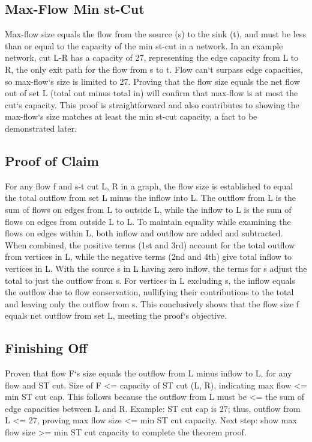 \subsection*{Max-Flow  Min st-Cut}
Max-flow size equals the flow from the source (s) to the sink (t), and must be less than or equal to the capacity of the min st-cut in a network.
In an example network, cut L-R has a capacity of 27, representing the edge capacity from L to R, the only exit path for the flow from s to t.
Flow can`t surpass edge capacities, so max-flow`s size is limited to 27.
Proving that the flow size equals the net flow out of set L (total out minus total in) will confirm that max-flow is at most the cut`s capacity.
This proof is straightforward and also contributes to showing the max-flow`s size matches at least the min st-cut capacity, a fact to be demonstrated later.

\subsection*{Proof of Claim}
For any flow f and s-t cut L, R in a graph, the flow size is established to equal the total outflow from set L minus the inflow into L\@.
The outflow from L is the sum of flows on edges from L to outside L, while the inflow to L is the sum of flows on edges from outside L to L\@.
To maintain equality while examining the flows on edges within L, both inflow and outflow are added and subtracted.
When combined, the positive terms (1st and 3rd) account for the total outflow from vertices in L, while the negative terms (2nd and 4th) give total inflow to vertices in L\@.
With the source s in L having zero inflow, the terms for s adjust the total to just the outflow from s.
For vertices in L excluding s, the inflow equals the outflow due to flow conservation, nullifying their contributions to the total and leaving only the outflow from s.
This conclusively shows that the flow size f equals net outflow from set L, meeting the proof`s objective.

\subsection*{Finishing Off}
Proven that flow F`s size equals the outflow from L minus inflow to L, for any flow and ST cut.
Size of F \textless{}= capacity of ST cut (L, R), indicating max flow \textless{}= min ST cut cap.
This follows because the outflow from L must be \textless{}= the sum of edge capacities between L and R\@.
Example: ST cut cap is 27; thus, outflow from L \textless{}= 27, proving max flow size \textless{}= min ST cut capacity.
Next step: show max flow size \textgreater{}= min ST cut capacity to complete the theorem proof.

